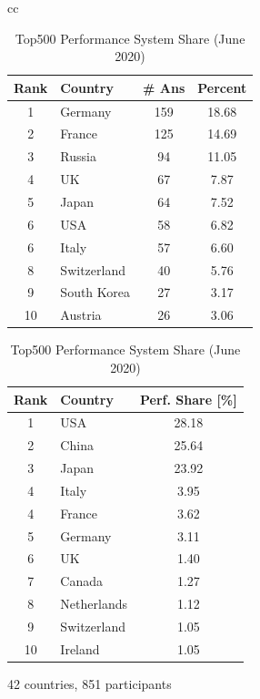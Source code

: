 \documentclass[sigconf,nonacm]{acmart}
\begin{document}
\begin{table}[htb]%
\scriptsize
\begin{center}%
\begin{tabular}[t]{cc}

\begin{minipage}[t]{0.5\hsize}
\begin{center}%
\caption{\small Top 10 Countries of Participants}
\label{tab:countries}%
\begin{tabular}{c|l|c|c}%
\hline%
Rank & Country & \# Ans & Percent \\%
\hline%
1 & Germany 	& 159 & 18.68 \\%
2 & France 	& 125 & 14.69 \\%
3 & Russia 	& 94  & 11.05 \\%
4 & UK 		& 67  &  7.87 \\%
5 & Japan 	& 64  &  7.52 \\%
6 & USA 	& 58  &  6.82 \\%
6 & Italy 	& 57  &  6.60 \\%
\hline
8 & Switzerland & 40  &  5.76 \\%
9 & South Korea & 27  &  3.17 \\%
10 & Austria 	& 26  &  3.06 \\%
\hline%
\end{tabular}%
\end{center}%
\end{minipage}

\hspace{1mm}

\begin{minipage}[t]{0.5\hsize}
\begin{center}%
\caption{\small Top500 Performance System Share (June 2020)\cite{Top500}}
\label{tab:top500-share}%
\begin{tabular}{c|l|c}%
\hline%
Rank & Country & Perf. Share [\%] \\%
\hline%
1  & USA 	  & 28.18 \\%
2  & China 	  & 25.64 \\%
3  & Japan 	  & 23.92 \\%
4  & Italy	  & 3.95  \\%
4  & France	  & 3.62  \\%
5  & Germany 	  & 3.11  \\%
6  & UK		  & 1.40  \\%
7  & Canada	  & 1.27  \\%
8  & Netherlands  & 1.12  \\%
9  & Switzerland  & 1.05  \\%
10 & Ireland	  & 1.05  \\%
\hline%
\end{tabular}%
\end{center}%
\end{minipage}%

\end{tabular}%
\end{center}%
42 countries, 851 participants\\%
\end{table}%
\end{document}
